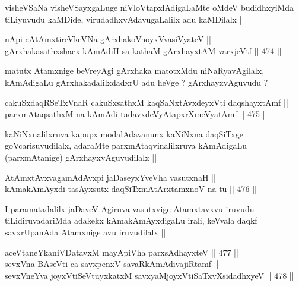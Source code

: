 \begin{artha}
visheVSaNa visheVSayxgaLuge niVloVtapxlAdigaLaMte oMdeV budidhxyiMda
tiLiyuvudu kaMDide, virudadhxvAdavugaLalilx adu kaMDilalx ||
\end{artha}

\begin{shl}
nApi cA\s \s tAmxtireVkeVNa gArxhakoV\s noyxV\s vasiVyateV || \\
gArxhakasathxshacx kAmAdiH sa kathaM gArxhayxtAM varxjeVtf ||  474 ||  
\end{shl}

\begin{artha}
matutx Atamxnige beVreyAgi gArxhaka matotxMdu niNaRyavAgilalx,
kAmAdigaLu gArxhakadalilxdadxrU adu heVge ? gArxhayxvAguvudu ?
\end{artha}


\begin{shl}
cakuSxdaqRSeTxVnaR cakuSxsathxM kaqSaNxtAvxdeyxVti daqshayxtAmf || \\
parxmAtaqsathxM na kAmAdi tadavxdeVyAtapxrXmeVyatAmf ||  475 ||  
\end{shl}

\begin{artha}
kaNiNxnalilxruva kapupx modalAdavanunx kaNiNxna daqSiTxge
goVcarisuvudilalx, adaraMte parxmAtaqvinalilxruva kAmAdigaLu
(parxmAtanige) gArxhayxvAguvudilalx ||
\end{artha}

\begin{shl}
AtAmxtAvxvagamAdAvx\s pi jaDaseyxYveVha vasutxnaH ||  \\
kAmakAmAyxdi tasAyxsutx daqSiTxmAtArxtamxnoV na tu ||  476 ||  
\end{shl}

\begin{artha}
I paramatadalilx jaDaveV Agiruva vasutxvige Atamxtavxvu iruvudu
tiLidiruvadariMda adakekx kAmakAmAyxdigaLu irali, keVvala daqkf
savxrUpanAda Atamxnige avu iruvudilalx ||
\end{artha}


\begin{shl}
aceVtaneYkaniVDatavxM mayA\s piVha parxsAdhayxteV ||  477 ||  \\
sevxVna BAseVti ca savxpenxV savaRkAmAdivajiRtamf || \\
sevxVneYva joyxVtiSeVtuyxkatxM savxyaMjoyxVtiSaTxvXsidadhxyeV ||  478 ||  
\end{shl}

